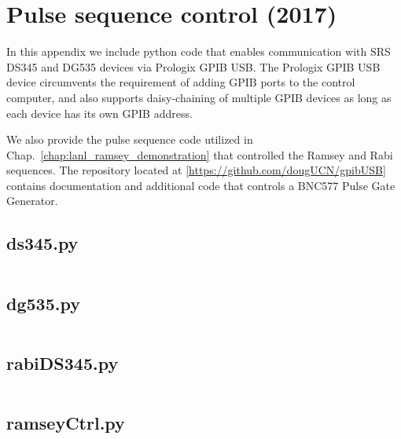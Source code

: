 
\chapter{Pulse sequence control (2017)}\label{appx:gpib_usb_pulse_sequence}


In this appendix we include python code that enables communication with SRS DS345 and DG535 devices via Prologix GPIB USB. The Prologix GPIB USB device circumvents the requirement of adding GPIB ports to the control computer, and also supports daisy-chaining of multiple GPIB devices as long as each device has its own GPIB address.

We also provide the pulse sequence code utilized in Chap.~\ref{chap:lanl_ramsey_demonstration} that controlled the Ramsey and Rabi sequences. The repository located at [\url{https://github.com/dougUCN/gpibUSB}] contains documentation and additional code that controls a BNC577 Pulse Gate Generator.

\section{ds345.py}

\inputminted{python}{code_snippets/ds345.py}

\section{dg535.py}

\inputminted{python}{code_snippets/dg535.py}

\section{rabiDS345.py}

\inputminted{python}{code_snippets/rabiDS345.py}

\section{ramseyCtrl.py}

\inputminted{python}{code_snippets/ramseyCtrl.py}

